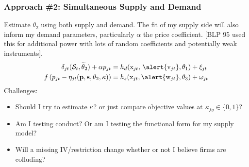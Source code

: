 \documentclass[xcolor=pdftex,dvipsnames,table,mathserif,aspectratio=169]{beamer}
\begin{document}
\begin{frame}
\frametitle{Approach \#2: Simultaneous Supply and Demand}
Estimate $\theta_2$ using both supply and demand. The fit of my supply side will also inform my demand parameters, particularly $\alpha$ the price coefficient. [BLP 95 used this for additional power with lots of random coefficients and potentially weak instruments].
\begin{align*}
\delta_{jt}(\mathcal{S}_t,\widetilde{\theta}_2) + \alpha p_{jt} &= h_d(\textrm{x}_{jt}, \, \alert{\textrm{v}_{jt}},\theta_1)  + \xi_{jt} \\
 f \left( p_{jt} - \eta_{jt}(\mathbf{p},\mathbf{s},\theta_2,\kappa) \right) &= h_s(\textrm{x}_{jt}, \alert{\textrm{w}_{jt}},\theta_3) + \omega_{jt}
\end{align*}
Challenges:
\begin{itemize}
\item Should I try to estimate $\kappa$? or just compare objective values at $\kappa_{fg}\in\{0,1\}$?
\item Am I testing conduct? Or am I testing the functional form for my supply model?
\item Will a missing IV/restriction change whether or not I believe firms are colluding?
\end{itemize}
\end{frame}

\end{document}
